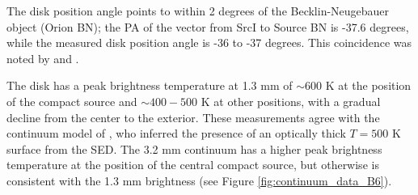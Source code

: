 \documentclass[twocolumn]{aastex62}
\newcommand{\sourcei}{SrcI\xspace}
\begin{document}



The disk position angle points to within 2 degrees of the Becklin-Neugebauer
object (Orion BN); the PA of the vector from \sourcei to Source BN is -37.6
degrees, while the measured disk position angle is -36 to -37 degrees.
This coincidence was noted by \citet{Bally2011a} and \citet{Goddi2011b}.


The disk has a peak brightness temperature at 1.3 mm of $\sim600$ K at the
position of the compact source and $\sim400-500$ K at other positions, with a
gradual decline from the center to the exterior.  These measurements agree with
the continuum model of \citet{Plambeck2016a}, who inferred the presence of an
optically thick $T=500$ K surface from the SED.  The 3.2 mm continuum has a
higher peak brightness temperature at the position of the central compact
source, but otherwise is consistent with the 1.3 mm brightness (see Figure
\ref{fig:continuum_data_B6}).
\end{document}
